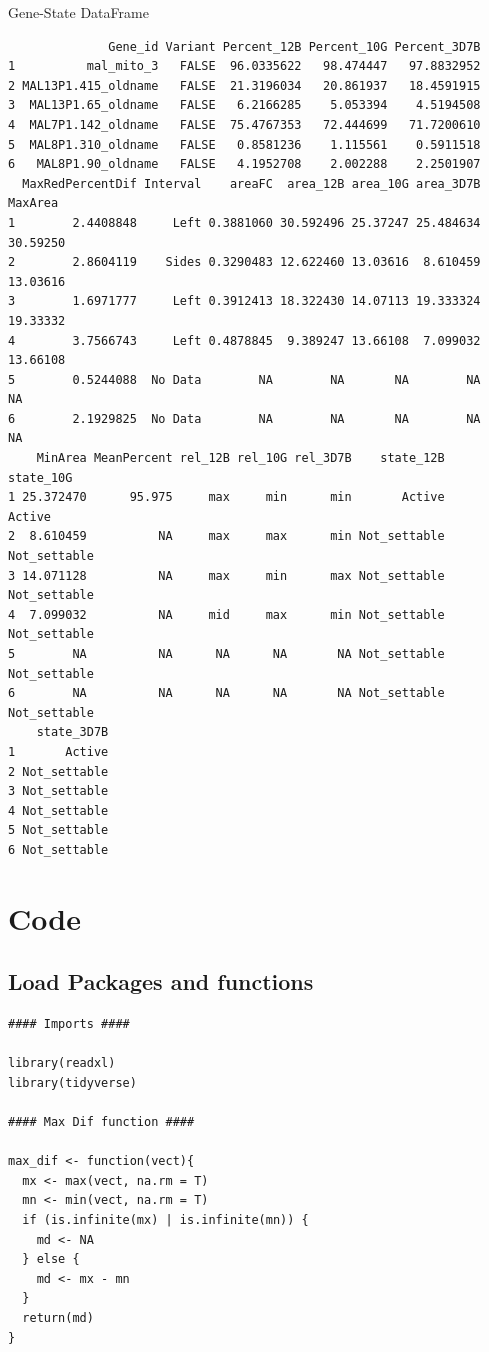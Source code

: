 \documentclass[11pt]{article}
\begin{document}
Gene-State DataFrame
\begin{verbatim}
              Gene_id Variant Percent_12B Percent_10G Percent_3D7B
1          mal_mito_3   FALSE  96.0335622   98.474447   97.8832952
2 MAL13P1.415_oldname   FALSE  21.3196034   20.861937   18.4591915
3  MAL13P1.65_oldname   FALSE   6.2166285    5.053394    4.5194508
4  MAL7P1.142_oldname   FALSE  75.4767353   72.444699   71.7200610
5  MAL8P1.310_oldname   FALSE   0.8581236    1.115561    0.5911518
6   MAL8P1.90_oldname   FALSE   4.1952708    2.002288    2.2501907
  MaxRedPercentDif Interval    areaFC  area_12B area_10G area_3D7B  MaxArea
1        2.4408848     Left 0.3881060 30.592496 25.37247 25.484634 30.59250
2        2.8604119    Sides 0.3290483 12.622460 13.03616  8.610459 13.03616
3        1.6971777     Left 0.3912413 18.322430 14.07113 19.333324 19.33332
4        3.7566743     Left 0.4878845  9.389247 13.66108  7.099032 13.66108
5        0.5244088  No Data        NA        NA       NA        NA       NA
6        2.1929825  No Data        NA        NA       NA        NA       NA
    MinArea MeanPercent rel_12B rel_10G rel_3D7B    state_12B    state_10G
1 25.372470      95.975     max     min      min       Active       Active
2  8.610459          NA     max     max      min Not_settable Not_settable
3 14.071128          NA     max     min      max Not_settable Not_settable
4  7.099032          NA     mid     max      min Not_settable Not_settable
5        NA          NA      NA      NA       NA Not_settable Not_settable
6        NA          NA      NA      NA       NA Not_settable Not_settable
    state_3D7B
1       Active
2 Not_settable
3 Not_settable
4 Not_settable
5 Not_settable
6 Not_settable
\end{verbatim}

\section{Code}
\label{sec:orgc1172ce}
\subsection{Load Packages and functions}
\label{sec:orgf8726c9}
\begin{verbatim}
#### Imports ####

library(readxl)
library(tidyverse)

#### Max Dif function ####

max_dif <- function(vect){
  mx <- max(vect, na.rm = T)
  mn <- min(vect, na.rm = T)
  if (is.infinite(mx) | is.infinite(mn)) {
    md <- NA
  } else {
    md <- mx - mn
  }
  return(md)
}
\end{verbatim}
\end{document}
